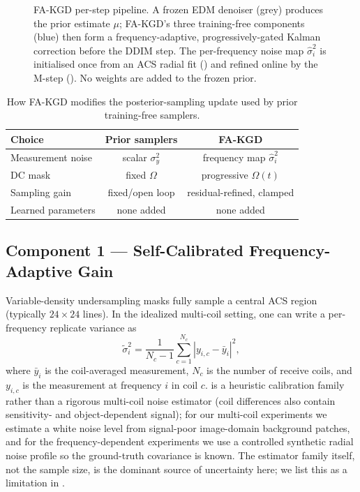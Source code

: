 \documentclass[10pt,twocolumn,letterpaper]{article}
\newcommand{\circnum}[1]{\ding{\numexpr171+#1\relax}}
\newcommand{\hatsig}{\hat{\sigma}}
\begin{document}
\begin{figure}[t]
{}
\caption{FA-KGD per-step pipeline. A frozen EDM denoiser (grey) produces the
prior estimate $\mu$; FA-KGD's three training-free components (blue) then form
a frequency-adaptive, progressively-gated Kalman correction before the DDIM
step. The per-frequency noise map $\hatsig_i^2$ is initialised once from an ACS
radial fit () and refined online by the M-step
(). No weights are added to the frozen prior.}
\label{fig:pipeline}
\end{figure}

\begin{table}[t]
\centering
\caption{How FA-KGD modifies the posterior-sampling update used by prior
training-free samplers.}
\label{tab:method_compare}
\small
\setlength{\tabcolsep}{3pt}
\begin{tabular}{@{}lcc@{}}
\toprule
\textbf{Choice} & \textbf{Prior samplers} & \textbf{FA-KGD} \\
\midrule
Measurement noise & scalar $\sigma_y^2$ & frequency map $\hatsig_i^2$ \\
DC mask & fixed $\Omega$ & progressive $\Omega(t)$ \\
Sampling gain & fixed/open loop & residual-refined, clamped \\
Learned parameters & none added & none added \\
\bottomrule
\end{tabular}
\end{table}

\subsection{Component 1 — Self-Calibrated Frequency-Adaptive Gain}

Variable-density undersampling masks fully sample a central ACS region
(typically $24 \times 24$ lines). In the idealized multi-coil setting, one
can write a per-frequency replicate variance as
\begin{equation}
  \tilde{\sigma}_i^2 = \frac{1}{N_c - 1}
  \sum_{c=1}^{N_c} \left|y_{i,c} - \bar{y}_i\right|^2,
  \label{eq:acs}
\end{equation}
where $\bar{y}_i$ is the coil-averaged measurement, $N_c$ is the number of
receive coils, and $y_{i,c}$ is the measurement at frequency $i$ in coil $c$.
 is a
heuristic calibration family rather than a rigorous multi-coil noise
estimator (coil differences also contain sensitivity- and
object-dependent signal); for our multi-coil experiments we estimate a
white noise level from signal-poor image-domain background patches, and
for the frequency-dependent experiments we use a controlled synthetic
radial noise profile so the ground-truth covariance is known. The
estimator family itself, not the sample size, is the dominant source of
uncertainty here; we list this as a limitation in .
\end{document}
